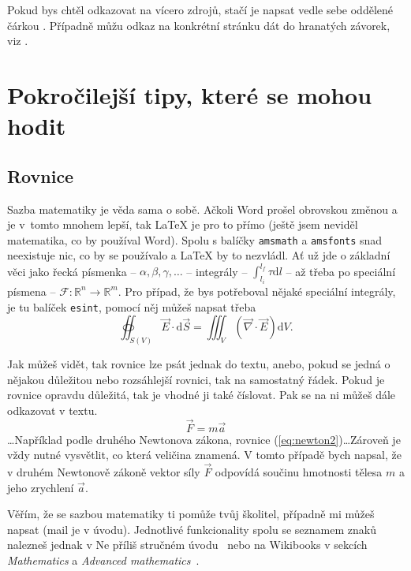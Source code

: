 \documentclass[12pt, a4paper,
    twoside,        %
    openright
]{report}
\newcommand{\dif}{\mathrm{d}} %
\begin{document}
Pokud bys chtěl odkazovat na vícero zdrojů, stačí je napsat vedle sebe oddělené čárkou \cite{LaTeXprirucka, citacePRO, Born2019}. Případně můžu odkaz na konkrétní stránku dát do hranatých závorek, viz \cite[str.~1]{Born2019}.


\section[Pokročilejší tipy]{Pokročilejší tipy, které se mohou hodit}

\subsection{Rovnice}

Sazba matematiky je věda sama o sobě. Ačkoli Word prošel obrovskou změnou a je v~tomto mnohem lepší, tak \LaTeX{ }je pro to přímo (ještě jsem neviděl matematika, co by používal Word). Spolu s balíčky \texttt{amsmath} a \texttt{amsfonts} snad neexistuje nic, co by se používalo a \LaTeX{ }by to nezvládl. Ať už jde o základní věci jako řecká písmenka -- $\alpha, \beta, \gamma, \dots$ -- integrály -- $\int_{l_i}^{l_f} \tau \dif l $ -- až třeba po speciální písmena -- $\mathscr{F}: \mathbb{R}^n \to \mathbb{R}^m$. Pro případ, že bys potřeboval nějaké speciální integrály, je tu balíček \texttt{esint}, pomocí něj můžeš napsat třeba
$$ \oiint_{S(V)} \vec{E} \cdot \dif \vec{S} = \iiint_{V} \left(\vec{\nabla} \cdot \vec{E}\right) \dif V .$$

Jak můžeš vidět, tak rovnice lze psát jednak do textu, anebo, pokud se jedná o nějakou důležitou nebo rozsáhlejší rovnici, tak na samostatný řádek. Pokud je rovnice opravdu důležitá, tak je vhodné ji také číslovat. Pak se na ni můžeš dále odkazovat v textu.
\begin{equation}
    \vec{F} = m \vec{a}
    \label{eq:newton2}
\end{equation}
\dots Například podle druhého Newtonova zákona, rovnice (\ref{eq:newton2})\dots Zároveň je vždy nutné vysvětlit, co která veličina znamená. V tomto případě bych napsal, že v druhém Newtonově zákoně vektor síly $\vec F$ odpovídá součinu hmotnosti tělesa $m$ a jeho zrychlení $\vec a$.

Věřím, že se sazbou matematiky ti pomůže tvůj školitel, případně mi můžeš napsat (mail je v úvodu). Jednotlivé funkcionality spolu se seznamem znaků nalezneš jednak v Ne příliš stručném úvodu~\cite{LaTeXprirucka} nebo na Wikibooks v sekcích \emph{Mathematics} a \emph{Advanced mathematics}~\cite{wikibooksLaTeX}.
\end{document}

